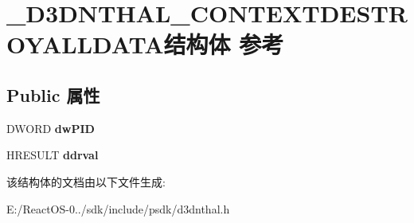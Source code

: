 \hypertarget{struct___d3_d_n_t_h_a_l___c_o_n_t_e_x_t_d_e_s_t_r_o_y_a_l_l_d_a_t_a}{}\section{\+\_\+\+D3\+D\+N\+T\+H\+A\+L\+\_\+\+C\+O\+N\+T\+E\+X\+T\+D\+E\+S\+T\+R\+O\+Y\+A\+L\+L\+D\+A\+T\+A结构体 参考}
\label{struct___d3_d_n_t_h_a_l___c_o_n_t_e_x_t_d_e_s_t_r_o_y_a_l_l_d_a_t_a}
\subsection*{Public 属性}
\begin{DoxyCompactItemize}
\item 
\mbox{\label{struct___d3_d_n_t_h_a_l___c_o_n_t_e_x_t_d_e_s_t_r_o_y_a_l_l_d_a_t_a_a8759c23eff415ac7f1e3f2deead37d2e}} 
D\+W\+O\+RD {\bfseries dw\+P\+ID}
\item 
\mbox{\label{struct___d3_d_n_t_h_a_l___c_o_n_t_e_x_t_d_e_s_t_r_o_y_a_l_l_d_a_t_a_a449aa1c57c31fd4b900c888cfc47fa5d}} 
H\+R\+E\+S\+U\+LT {\bfseries ddrval}
\end{DoxyCompactItemize}


该结构体的文档由以下文件生成\+:\begin{DoxyCompactItemize}
\item 
E\+:/\+React\+O\+S-\/0../sdk/include/psdk/d3dnthal.\+h\end{DoxyCompactItemize}
